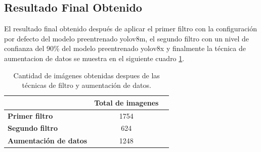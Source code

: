 \subsection{Resultado Final Obtenido}

El resultado final obtenido después de aplicar el primer filtro con la configuración por defecto del modelo  preentrenado yolov8m, el segundo filtro con un nivel de confianza del 90\% del modelo preentrenado yolov8x y finalmente la técnica de aumentacion de datos se muestra en el siguiente cuadro \ref{tab:final_report}.

\begin{table}[ht]
  \centering
  \begin{tabular}{|l|c|c|}
      \hline
       & \textbf{Total de imagenes} \\ \hline
      \textbf{Primer filtro} & 1754 \\ \hline
      \textbf{Segundo filtro} & 624 \\ \hline
      \textbf{Aumentación de datos} & 1248 \\ \hline
  \end{tabular}
  \caption{Cantidad de imágenes obtenidas despues de las técnicas de filtro y aumentación de datos.}
  \label{tab:final_report}
\end{table}

